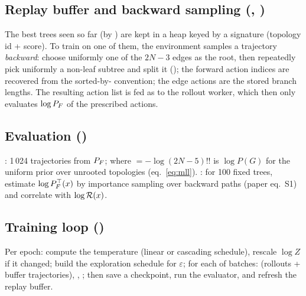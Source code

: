 \subsection{Replay buffer and backward sampling (, )}
The best trees seen so far (by ) are kept in a heap keyed by a signature (topology id + score). To train on one of them, the environment samples a trajectory \emph{backward}: choose uniformly one of the $2N-3$ edges as the root, then repeatedly pick uniformly a non-leaf subtree and split it (); the forward action indices are recovered from the sorted-by- convention; the edge actions are the stored branch lengths. The resulting action list is fed as  to the rollout worker, which then only evaluates $\log P_F$ of the prescribed actions.

\subsection{Evaluation ()}
: 1\,024 trajectories from $P_F$;  where  $=-\log(2N-5)!!$ is $\log P(G)$ for the uniform prior over unrooted topologies (eq.~\eqref{eq:mll}). : for 100 fixed trees, estimate $\log P_F^\top(x)$ by importance sampling over backward paths (paper eq.~S1) and correlate with $\log\mathcal{R}(x)$.

\subsection{Training loop ()}
Per epoch: compute the temperature (linear or cascading schedule), rescale $\log Z$ if it changed; build the exploration schedule for $\varepsilon$; for each of  batches:  (rollouts + buffer trajectories), , ; then save a checkpoint, run the evaluator, and refresh the replay buffer.
\clearpage
